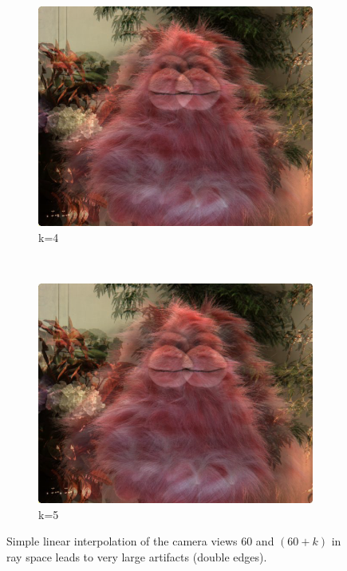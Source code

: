 \documentclass[a4paper]{article}
\begin{document}
\begin{figure}[ht]
	\vspace{2mm}
	\begin{subfigure}[h]{0.48\textwidth}
	  \centering
	  \includegraphics[width=\textwidth]{LinearInterpolation60_64}
	  \caption*{k=4}
	\end{subfigure}
	~
	\begin{subfigure}[h]{0.48\textwidth}
	  \centering
	  \includegraphics[width=\textwidth]{LinearInterpolation60_65}
	  \caption*{k=5}
	\end{subfigure}
\caption{Simple linear interpolation of the camera views $60$ and $(60 + k)$ in ray space leads to very large artifacts (double edges).}
\label{fig:linearInterpolation}
\end{figure}
\end{document}
